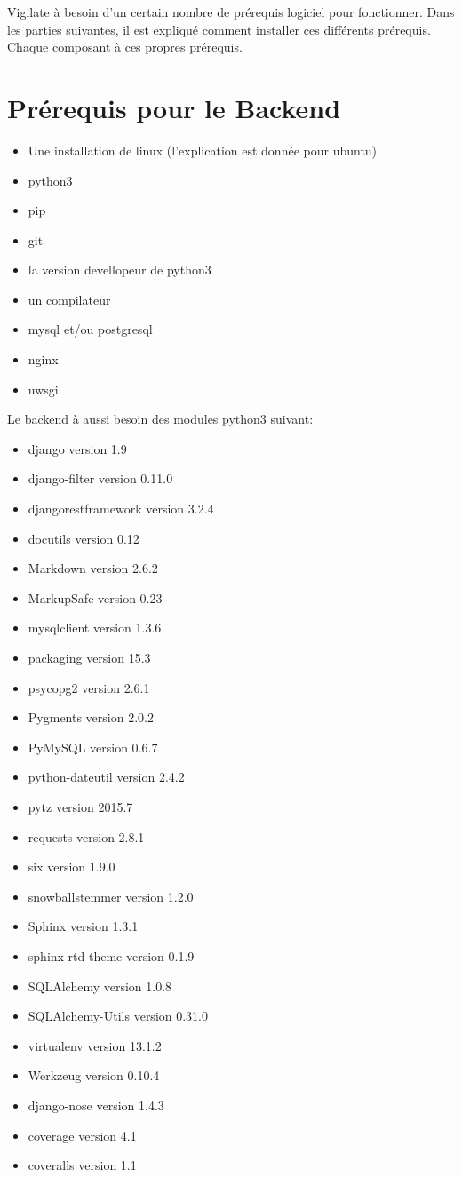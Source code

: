 Vigilate à besoin d’un certain nombre de prérequis logiciel pour fonctionner. Dans les parties suivantes, il est expliqué comment installer ces différents prérequis. Chaque composant à ces propres prérequis.

\section{Prérequis pour le Backend}

\begin{itemize}
\item Une installation de linux (l’explication est donnée pour ubuntu)
\item python3
\item pip
\item git
\item la version devellopeur de python3
\item un compilateur
\item mysql et/ou postgresql
\item nginx
\item uwsgi
\end{itemize}

Le backend à aussi besoin des modules python3 suivant:
\begin{itemize}
\item django version 1.9
\item django-filter version 0.11.0
\item djangorestframework version 3.2.4
\item docutils version 0.12
\item Markdown version 2.6.2
\item MarkupSafe version 0.23
\item mysqlclient version 1.3.6
\item packaging version 15.3
\item psycopg2 version 2.6.1
\item Pygments version 2.0.2
\item PyMySQL version 0.6.7
\item python-dateutil version 2.4.2
\item pytz version 2015.7
\item requests version 2.8.1
\item six version 1.9.0
\item snowballstemmer version 1.2.0
\item Sphinx version 1.3.1
\item sphinx-rtd-theme version 0.1.9
\item SQLAlchemy version 1.0.8
\item SQLAlchemy-Utils version 0.31.0
\item virtualenv version 13.1.2
\item Werkzeug version 0.10.4
\item django-nose version 1.4.3
\item coverage version 4.1
\item coveralls version 1.1
\end{itemize}


